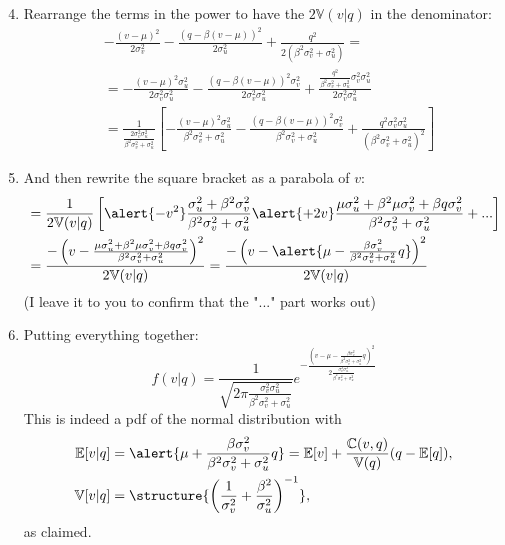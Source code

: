 \documentclass[english,10pt
,aspectratio=169
]{beamer}
\begin{document}
\begin{frame}
	\begin{enumerate}
		\setcounter{enumi}{3}
		\item Rearrange the terms in the power to have the $2\mathbb{V}(v|q)$ in the denominator:
		\begin{align*}
			&- \frac{(v-\mu)^2}{2\sigma^2_v} - \frac{(q-\beta(v-\mu))^2}{2\sigma^2_u } + \frac{q^2}{2(\beta^2 \sigma^2_v + \sigma^2_u)} =
			\\
			&= - \frac{(v-\mu)^2 \sigma^2_u}{2\sigma^2_v \sigma^2_u} - \frac{(q-\beta(v-\mu))^2 \sigma^2_v}{2 \sigma^2_v \sigma^2_u } + \frac{\frac{q^2}{\beta^2 \sigma^2_v + \sigma^2_u} \sigma^2_v  \sigma^2_u}{2 \sigma^2_v  \sigma^2_u} \
			\\
			&= \frac{1}{\frac{2 \sigma^2_v \sigma^2_u}{\beta^2 \sigma^2_v+\sigma^2_u}} \left[ -\frac{(v-\mu)^2 \sigma^2_u}{\beta^2 \sigma^2_v+\sigma^2_u} - \frac{(q-\beta(v-\mu))^2 \sigma^2_v}{\beta^2 \sigma^2_v+\sigma^2_u} + \frac{q^2 \sigma^2_v  \sigma^2_u}{ \left(\beta^2 \sigma^2_v + \sigma^2_u \right)^2} \right]
		\end{align*}
		\item And then rewrite the square bracket as a parabola of $v$:
		\begin{align*}
			&= \frac{1}{2\mathbb{V}(v|q)} \left[ \alert{-v^2} \frac{ \sigma^2_u + \beta^2 \sigma^2_v }{\beta^2 \sigma^2_v+\sigma^2_u} \alert{+ 2v} \frac{ \mu \sigma^2_u + \beta^2 \mu \sigma^2_v + \beta q \sigma^2_v }{\beta^2 \sigma^2_v+\sigma^2_u} + ... \right]
			\\
			&= \frac{-\left( v - \frac{\mu \sigma^2_u + \beta^2 \mu \sigma^2_v + \beta q \sigma^2_v}{\beta^2 \sigma^2_v + \sigma^2_u} \right)^2 }{2\mathbb{V}(v|q)}
			= \frac{-\left( v-\alert{\mu-\frac{\beta \sigma^2_v}{\beta^2 \sigma^2_v + \sigma^2_u}q } \right)^2 }{2\mathbb{V}(v|q)}
		\end{align*} 
		(I leave it to you to confirm that the "..." part works out)
	\end{enumerate}
\end{frame}


\begin{frame}
	\begin{enumerate}
		\setcounter{enumi}{5}
		\item Putting everything together:
		\[
			f(v|q) = \frac{1}{\sqrt{2 \pi \frac{\sigma^2_v \sigma^2_u}{\beta^2 \sigma^2_v+\sigma^2_u}}} e^{-\frac{\left( v - \mu - \frac{\beta \sigma^2_v}{\beta^2 \sigma^2_v + \sigma^2_u}q \right)^2 }{2 \frac{\sigma^2_v \sigma^2_u}{\beta^2 \sigma^2_v+\sigma^2_u}}}
		\]
		This is indeed a pdf of the normal distribution with 
		\begin{align*}
			\mathbb{E}[v|q] &= \alert{\mu+\frac{\beta \sigma^2_v}{\beta^2 \sigma^2_v + \sigma^2_u}q} = \mathbb{E}[v] + \frac{\mathbb{C}(v,q)}{\mathbb{V}(q)} (q-\mathbb{E}[q]),
			\\
			\mathbb{V}[v|q] &= \structure{ \left( \frac{1}{\sigma^2_v}+\frac{\beta^2}{\sigma^2_u} \right)^{-1}},
		\end{align*}
		as claimed. 
	\end{enumerate}
\end{frame}
\end{document}
